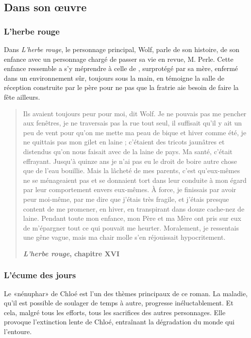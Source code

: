 \subsection{Dans son \oe{}uvre}

\subsubsection{L'herbe rouge}
Dans \emph{L'herbe rouge}, le personnage principal, Wolf, parle de son histoire, de son enfance
avec un personnage chargé de passer sa vie en revue, M. Perle.
Cette enfance ressemble a s'y méprendre à celle de \BV, surprotégé
par sa mère, enfermé dans un environnement sûr, toujours sous la main, en témoigne la
salle de réception construite par le père pour ne pas que la fratrie aie besoin de faire
la fête ailleurs.

{\small
\begin{quotation}
Ils avaient toujours peur pour moi, dit Wolf. Je ne pou­vais pas me pencher aux fenêtres,
je ne traversais pas la rue tout seul, il suffi­sait qu'il y ait un peu de vent pour qu'on
me mette ma peau de bique et hiver comme été, je ne quittais pas mon gilet en laine ;
c’étaient des tricots jaunâtres et distendus qu’on nous faisait avec de la laine de pays.
Ma santé, c’était effrayant. Jus­qu’à quinze ans je n’ai pas eu le droit de boire autre chose
que de l’eau bouillie. Mais la lâcheté de mes parents, c’est qu’eux-mêmes ne se ménageaient
pas et se donnaient tort dans leur conduite à mon égard par leur comportement envers eux-mêmes.
À force, je finis­sais par avoir peur moi-même, par me dire que j’étais très fragile, et j’étais
presque content de me promener, en hiver, en transpirant dans douze cache-nez de laine. Pendant
toute mon enfance, mon Père et ma Mère ont pris sur eux de m’épargner tout ce qui pouvait me
heurter. Mo­ra­le­ment, je ressentais une gêne vague, mais ma chair molle s’en ré­jouis­sait
hypocritement.

{\bf \emph{L'herbe rouge}, chapitre XVI}
\end{quotation}
}


\subsubsection{L'écume des jours}
Le «nénuphar» de Chloé est l'un des thèmes principaux
de ce roman. La maladie, qu'il est possible de soulager de temps à autre,
progresse inéluctablement. Et cela, malgré tous les efforts, tous les
sacrifices des autres personnages. Elle provoque l'extinction lente
de Chloé, entraînant la dégradation du monde qui l'entoure.


